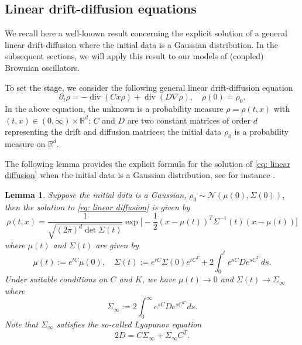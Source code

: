 \documentclass[a4paper,twoside]{article}      %
\newtheorem{lemma}[theorem]{Lemma}
\theoremstyle{definition}
\def\div{\mathop{\mathrm{div}}\nolimits}
\newcommand{\AM}{\textcolor{black}}
\begin{document}
\subsection{Linear drift-diffusion equations}
\label{sec: linear SDE}
We recall here a well-known result \AM{concerning} the explicit solution of a general linear drift-diffusion where the initial data is a Gaussian distribution. In the subsequent sections, we will apply this result to our models of (coupled) Brownian oscillators.

\AM{To set the stage, we }consider the following general linear drift-diffusion equation
\begin{equation}
\label{eq: linear diffusion}
    \partial_t\rho=-\div(Cx\rho)+\div(D\nabla\rho),\quad \rho(0)=\rho_0.
\end{equation}
In the above equation, the unknown is a probability measure  $\rho=\rho(t,x)$ with $(t,x)\in (0,\infty)\times \mathbb{R}^d$; $C$ and $D$ are two constant matrices of order $d$ representing the drift and diffusion matrices; the initial data $\rho_0$ is a probability measure on $\mathbb{R}^d$.

The following lemma provides the explicit formula for the solution of \eqref{eq: linear diffusion} when the initial data is a Gaussian distribution, see for instance \cite{gomes2018mean}.
\begin{lemma}
\label{lem: Gaussian sol}
Suppose the initial data is a Gaussian, $\rho_0\sim \mathcal{N}(\mu(0),\Sigma(0))$, then the solution to \eqref{eq: linear diffusion} is given by 
\begin{equation}
\label{eq: MKEGaussian}
\rho(t,x)=\frac{1}{\sqrt{(2\pi)^d\det\Sigma(t)}}\exp\Big[-\frac{1}{2}(x-\mu(t))^T \Sigma^{-1}(t)(x-\mu(t))\Big]  
\end{equation}
where $\mu(t)$ and $\Sigma(t)$ are given by
\begin{equation}
\label{eq: MKE Gaussian mean-variance}
\mu(t):=e^{tC}\mu(0),\quad \Sigma(t):=e^{t C}\Sigma(0)e^{t C^T}+2\int_0^t e^{s C}De^{s C^T}\,ds.
\end{equation}
Under suitable conditions on $C$ and $K$, we have $\mu(t)\rightarrow 0$ and $\Sigma(t)\rightarrow \Sigma_\infty$ where
$$
\Sigma_\infty:=2\int_0^\infty e^{sC}De^{sC^T}\,ds.
$$
Note that $\Sigma_\infty$ satisfies the so-called Lyapunov equation
$$
2D=C\Sigma_\infty+\Sigma_\infty C^T.
$$
\end{lemma}
\end{document}
